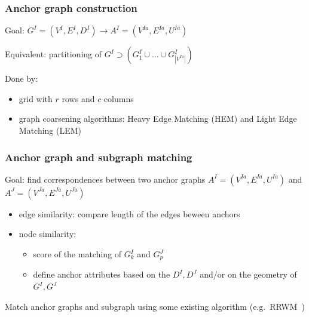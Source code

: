 \documentclass[hyperref={pdfpagelabels=false}]{beamer}
\begin{document}
\begin{frame}
\frametitle{Anchor graph construction}
Goal: $G^I=(V^I,E^I, D^I)\rightarrow A^I=(V^{Ia},E^{Ia},U^{Ia})$

Equivalent: partitioning of $G^I\supset(G^I_1\cup\dots\cup G^I_{|V^{Ia}|})$

Done by: \begin{itemize}
			\item grid with $r$ rows and $c$ columns
			\item graph coarsening algorithms: Heavy Edge Matching (HEM) and Light Edge Matching (LEM)
		\end{itemize}
\end{frame}
\begin{frame}
\frametitle{Anchor graph and subgraph matching}
Goal: find correspondences between two anchor graphs $A^I=(V^{Ia},E^{Ia},U^{Ia})$ and $A^J=(V^{Ja},E^{Ja},U^{Ja})$

\begin{itemize}
	\item edge similarity: compare length of the edges beween anchors
	\item node similarity: 
	\begin{itemize}
		\item score of the matching of $G^I_k$ and $G^J_p$
		\item define anchor attributes based on the $D^I,D^J$ and/or on the geometry of $G^I,G^J$
	\end{itemize}
\end{itemize}

Match anchor graphs and subgraph using some existing algorithm (e.g.~RRWM~{\tiny\citep{Cho2010_RRWM}})
\end{frame}
\end{document}
